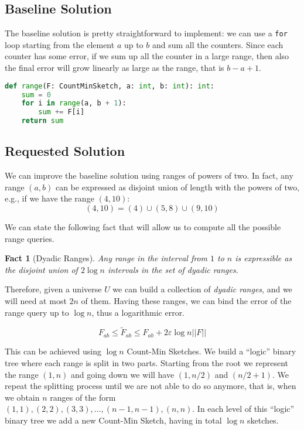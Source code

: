 \documentclass{article}
\newtheorem{fact}[theorem]{Fact}
\begin{document}
\subsection{Baseline Solution}

The baseline solution is pretty straightforward to implement: we can use a \verb+for+ loop starting from the element $a$ up to $b$ and sum
all the counters. Since each counter has some error, if we sum up all the counter in a large range,
then also the final error will grow linearly as large as the range, that is $b - a + 1$.

\begin{lstlisting}[language=Python,caption=`Range query for integer values']
def range(F: CountMinSketch, a: int, b: int): int:
    sum = 0
    for i in range(a, b + 1):
        sum += F[i]
    return sum
\end{lstlisting}

\subsection{Requested Solution}

\noindent We can improve the baseline solution using ranges of powers of two. In fact, any range $(a, b)$ can be
expressed as disjoint union of length with the powers of two, e.g., if we have the range $(4, 10)$:
$$
(4, 10) = (4) \cup (5, 8) \cup (9, 10)
$$

\noindent We can state the following fact that will allow us to compute all the possible range queries.

\begin{fact}[Dyadic Ranges]
    Any range in the interval from $1$ to $n$ is expressible as the disjoint union of $2 \log n$ intervals 
    in the set of dyadic ranges.
\end{fact}

\noindent Therefore, given a universe $U$ we can build a collection of \textit{dyadic ranges}, and we will
need at most $2n$ of them. Having these ranges, we can bind the error of the range query up to $\log n$, thus a
logarithmic error.

\begin{equation*}
    F_{ab} \le \tilde{F}_{ab} \le F_{ab} + 2 \varepsilon \log{n} ||F||
\end{equation*}

\noindent This can be achieved using $\log n$ Count-Min Sketches. We build a ``logic'' binary tree where each range is split in two parts.
Starting from the root we represent the range $(1, n)$ and going down we will have $(1, n/2)$ and $(n/2 + 1)$. We repeat the splitting process
until we are not able to do so anymore, that is, when we obtain $n$ ranges of the form $(1,1), (2, 2), (3, 3), \dots, (n-1, n-1), (n, n)$.
In each level of this ``logic'' binary tree we add a new Count-Min Sketch, having in total $\log n$ sketches.
\end{document}
